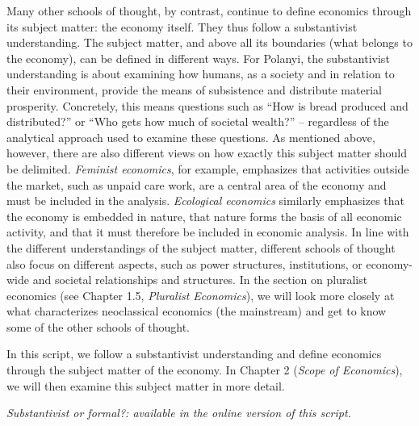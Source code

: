 \documentclass[
  british,
  a4paper,
  DIV=11,
  numbers=noendperiod,
  oneside,
  openany]{scrreprt}
\begin{document}
Many other schools of thought, by contrast, continue to define economics
through its subject matter: the economy itself. They thus follow a
substantivist understanding. The subject matter, and above all its
boundaries (what belongs to the economy), can be defined in different
ways. For Polanyi, the substantivist understanding is about examining
how humans, as a society and in relation to their environment, provide
the means of subsistence and distribute material prosperity. Concretely,
this means questions such as ``How is bread produced and distributed?''
or ``Who gets how much of societal wealth?'' -- regardless of the
analytical approach used to examine these questions. As mentioned above,
however, there are also different views on how exactly this subject
matter should be delimited. \emph{Feminist economics}, for example,
emphasizes that activities outside the market, such as unpaid care work,
are a central area of the economy and must be included in the analysis.
\emph{Ecological economics} similarly emphasizes that the economy is
embedded in nature, that nature forms the basis of all economic
activity, and that it must therefore be included in economic analysis.
In line with the different understandings of the subject matter,
different schools of thought also focus on different aspects, such as
power structures, institutions, or economy-wide and societal
relationships and structures. In the section on pluralist economics (see
Chapter 1.5, \emph{Pluralist Economics}), we will look more closely at
what characterizes neoclassical economics (the mainstream) and get to
know some of the other schools of thought.

In this script, we follow a substantivist understanding and define
economics through the subject matter of the economy. In Chapter 2
(\emph{Scope of Economics}), we will then examine this subject matter in
more detail.

\begin{tcolorbox}[enhanced jigsaw, arc=.35mm, bottomrule=.15mm, bottomtitle=1mm, breakable, colback=white, colbacktitle=quarto-callout-caution-color!10!white, colframe=quarto-callout-caution-color-frame, coltitle=black, left=2mm, leftrule=.75mm, opacityback=0, opacitybacktitle=0.6, rightrule=.15mm, title={Interactive exercise -- Substantivist or formal?}, titlerule=0mm, toprule=.15mm, toptitle=1mm]

\emph{Substantivist or formal?: available in the online version of this script.}

\end{tcolorbox}
\end{document}
